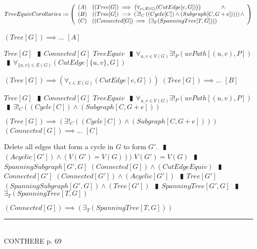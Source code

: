 \documentclass{book}
\newcommand{\abr}{:=}
\newcommand{\pipe}{$\phantom{(}\vrectangleblack\phantom{)}$}
\newcommand{\pr}[1]{\left(#1\right)}
\newcommand{\utup}[1]{\{#1\}}
\begin{document}
$TreeEquivCorollaries \abr
\left(\begin{array}{ll}
  (A) \phantom{-} \pr{(Tree[G]) \implies \pr{\forall_{e \in E(G)}(CutEdge[e, G])}} \hfill \land \hfill \\
  (B) \phantom{-} \pr{(Tree[G]) \implies \pr{\exists!_{C}\pr{(Cycle[C]) \land (Subgraph[C, G + e])}}} \hfill \land \hfill \\
  (C) \phantom{-} \pr{(Connected[G]) \implies \pr{\exists_{T}(SpanningTree[T, G])}}
\end{array}\right)$
\begin{enumerate}
  \lit $(Tree[G]) \implies \ldots$    $[A]$
  \begin{enumerate}
    \lit $Tree[G]$ \pipe $Connected[G]$
    \lit $TreeEquiv$ \pipe $\forall_{u, v \in V(G)} \exists!_{P}\pr{uvPath[(u, v), P]}$ \pipe $\forall_{\utup{u, v} \in E(G)}(CutEdge[\utup{u, v}, G])$
  \end{enumerate}
  \lit $(Tree[G]) \implies \pr{\forall_{e \in E(G)}(CutEdge[e, G])}$
  \lit $(Tree[G]) \implies \ldots$    $[B]$
  \begin{enumerate}
    \lit $Tree[G]$ \pipe $Connected[G]$
    \lit $TreeEquiv$ \pipe $\forall_{u, v \in V(G)} \exists!_{P}\pr{uvPath[(u, v), P]}$ \pipe $\exists!_{C}\pr{(Cycle[C]) \land (Subgraph[C, G + e])}$
  \end{enumerate}
  \lit $(Tree[G]) \implies \pr{\exists!_{C}\pr{(Cycle[C]) \land (Subgraph[C, G + e])}}$
  \lit $(Connected[G]) \implies \ldots$    $[C]$
  \begin{enumerate}
    \lit Delete all edges that form a cycle in $G$ to form $G'$. \pipe $(Acyclic[G']) \land \pr{V(G') = V(G)})$
    \lit $V(G') = V(G)$ \pipe $SpanningSubgraph[G', G]$
    \lit $(Connected[G]) \land (CutEdgeEquiv)$ \pipe $Connected[G']$
    \lit $(Connected[G']) \land (Acyclic[G'])$ \pipe $Tree[G']$
    \lit $(SpanningSubgraph[G', G]) \land (Tree[G'])$ \pipe $SpanningTree[G', G]$ \pipe $\exists_{T}(SpanningTree[T, G])$
  \end{enumerate}
  \lit $(Connected[G]) \implies \pr{\exists_{T}(SpanningTree[T, G])}$
\end{enumerate} \vspace{.75mm} \hrule \vspace{.75mm} \ \\ 

CONTHERE p. 69 

\end{document}
